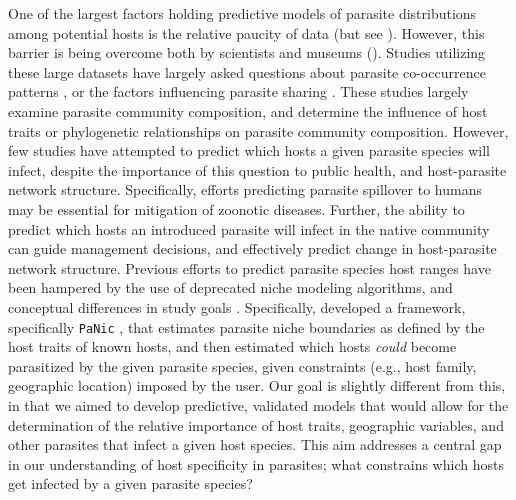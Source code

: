 \documentclass[12pt]{article}
\begin{document}
One of the largest factors holding predictive models of parasite distributions among potential hosts is the relative paucity of data (but see \cite{}). However, this barrier is being overcome both by scientists \cite{strona2012, nunn2005} and museums (\cite{gibson2005}). Studies utilizing these large datasets have largely asked questions about parasite co-occurrence patterns \cite{strona2013}, or the factors influencing parasite sharing \cite{braga2014, dallas2014b}. These studies largely examine parasite community composition, and determine the influence of host traits or phylogenetic relationships on parasite community composition. However, few studies have attempted to predict which hosts a given parasite species will infect, despite the importance of this question to public health, and host-parasite network structure. Specifically, efforts predicting parasite spillover to humans may be essential for mitigation of zoonotic diseases. Further, the ability to predict which hosts an introduced parasite will infect in the native community can guide management decisions, and effectively predict change in host-parasite network structure. Previous efforts to predict parasite species host ranges have been hampered by the use of deprecated niche modeling algorithms, and conceptual differences in study goals \citep{strona2012}. Specifically, \citet{strona2012} developed a framework, specifically \texttt{PaNic} \citep{strona2012panic}, that estimates parasite niche boundaries as defined by the host traits of known hosts, and then estimated which hosts \textit{could} become parasitized by the given parasite species, given constraints (e.g., host family, geographic location) imposed by the user. Our goal is slightly different from this, in that we aimed to develop predictive, validated models that would allow for the determination of the relative importance of host traits, geographic variables, and other parasites that infect a given host species. This aim addresses a central gap in our understanding of host specificity in parasites; what constrains which hosts get infected by a given parasite species? \\ 
 
\end{document}
